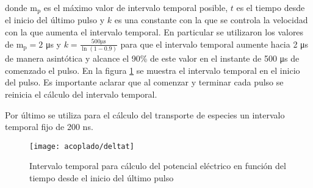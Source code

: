 donde $\mathrm{m_p}$ es el máximo valor de intervalo temporal posible, $t$ es el tiempo desde el inicio del último pulso y $k$ es una constante con la que se controla la velocidad con la que aumenta el intervalo temporal. En particular se utilizaron los valores de $\mathrm{m_p} = 2$ \si{\micro\second} y $k = \frac{500 \si{\micro\second}}{\ln (1 - 0.9)}$ para que el intervalo temporal aumente hacia 2 \si{\micro\second} de manera asintótica y alcance el 90\% de este valor en el instante de 500 \si{\micro\second} de comenzado el pulso. En la figura \ref{fig:deltat} se muestra el intervalo temporal en el inicio del pulso. Es importante aclarar que al comenzar y terminar cada pulso se reinicia el cálculo del intervalo temporal.

Por último se utiliza para el cálculo del transporte de especies un intervalo temporal fijo de 200 \si{\nano\second}.\\

\clearpage

\begin{figure}
	\centering
	\texttt{[image: acoplado/deltat]}
	\caption{Intervalo temporal para cálculo del potencial eléctrico en función del tiempo desde el inicio del último pulso}
	\label{fig:deltat}
\end{figure}





